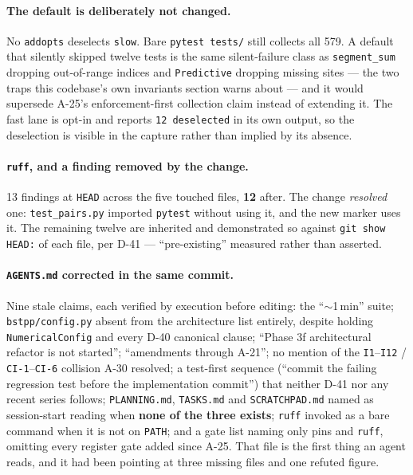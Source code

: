 \documentclass[
  10pt,
]{article}
\begin{document}
\paragraph{The default is deliberately not changed.}
No \texttt{addopts} deselects \texttt{slow}. Bare \texttt{pytest tests/} still collects all 579. A default that silently skipped twelve tests is the same silent-failure class as \texttt{segment\_sum} dropping out-of-range indices and \texttt{Predictive} dropping missing sites --- the two traps this codebase's own invariants section warns about --- and it would supersede A-25's enforcement-first collection claim instead of extending it. The fast lane is opt-in and reports \texttt{12 deselected} in its own output, so the deselection is visible in the capture rather than implied by its absence.

\paragraph{\texttt{ruff}, and a finding removed by the change.}
13 findings at \texttt{HEAD} across the five touched files, \textbf{12} after. The change \emph{resolved} one: \texttt{test\_pairs.py} imported \texttt{pytest} without using it, and the new marker uses it. The remaining twelve are inherited and demonstrated so against \texttt{git show HEAD:} of each file, per D-41 --- ``pre-existing'' measured rather than asserted.

\paragraph{\texttt{AGENTS.md} corrected in the same commit.}
Nine stale claims, each verified by execution before editing: the ``$\sim$1\,min'' suite; \texttt{bstpp/config.py} absent from the architecture list entirely, despite holding \texttt{NumericalConfig} and every D-40 canonical clause; ``Phase 3f architectural refactor is not started''; ``amendments through A-21''; no mention of the \texttt{I1}--\texttt{I12} / \texttt{CI-1}--\texttt{CI-6} collision A-30 resolved; a test-first sequence (``commit the failing regression test before the implementation commit'') that neither D-41 nor any recent series follows; \texttt{PLANNING.md}, \texttt{TASKS.md} and \texttt{SCRATCHPAD.md} named as session-start reading when \textbf{none of the three exists}; \texttt{ruff} invoked as a bare command when it is not on \texttt{PATH}; and a gate list naming only pins and \texttt{ruff}, omitting every register gate added since A-25. That file is the first thing an agent reads, and it had been pointing at three missing files and one refuted figure.
\end{document}
